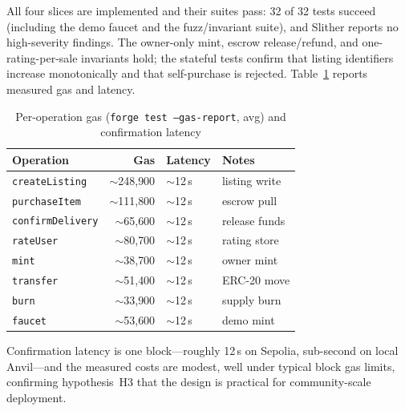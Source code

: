 All four slices are implemented and their suites pass: 32 of 32 tests succeed (including the demo faucet and the fuzz/invariant suite), and Slither reports no high-severity findings. The owner-only mint, escrow release/refund, and one-rating-per-sale invariants hold; the stateful tests confirm that listing identifiers increase monotonically and that self-purchase is rejected. Table~\ref{tab:gas} reports measured gas and latency.

\begin{table}[t]
\caption{Per-operation gas (\texttt{forge test --gas-report}, avg) and confirmation latency}
\label{tab:gas}
\centering\small
\setlength{\tabcolsep}{8pt}
\begin{tabular}{lrll}
\toprule
Operation & Gas & Latency & Notes \\
\midrule
\texttt{createListing}   & $\sim$248{,}900 & $\sim$12\,s & listing write \\
\texttt{purchaseItem}    & $\sim$111{,}800 & $\sim$12\,s & escrow pull \\
\texttt{confirmDelivery} & $\sim$65{,}600  & $\sim$12\,s & release funds \\
\texttt{rateUser}        & $\sim$80{,}700  & $\sim$12\,s & rating store \\
\midrule
\texttt{mint}     & $\sim$38{,}700 & $\sim$12\,s & owner mint \\
\texttt{transfer} & $\sim$51{,}400 & $\sim$12\,s & ERC-20 move \\
\texttt{burn}     & $\sim$33{,}900 & $\sim$12\,s & supply burn \\
\texttt{faucet}   & $\sim$53{,}600 & $\sim$12\,s & demo mint \\
\bottomrule
\end{tabular}
\end{table}

\noindent Confirmation latency is one block---roughly 12\,s on Sepolia, sub-second on local Anvil---and the measured costs are modest, well under typical block gas limits, confirming hypothesis~H3 that the design is practical for community-scale deployment.
